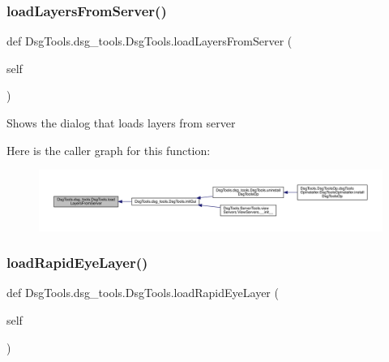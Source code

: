 \subsubsection{\texorpdfstring{load\+Layers\+From\+Server()}{loadLayersFromServer()}}
{\footnotesize\ttfamily def Dsg\+Tools.\+dsg\+\_\+tools.\+Dsg\+Tools.\+load\+Layers\+From\+Server (\begin{DoxyParamCaption}\item[{}]{self }\end{DoxyParamCaption})}

\begin{DoxyVerb}Shows the dialog that loads layers from server
\end{DoxyVerb}
 Here is the caller graph for this function\+:
\nopagebreak
\begin{figure}[H]
\begin{center}
\leavevmode
\includegraphics[width=350pt]{class_dsg_tools_1_1dsg__tools_1_1_dsg_tools_a285ff6e653cd985343cdf91acf8080ef_icgraph}
\end{center}
\end{figure}
\mbox{\label{class_dsg_tools_1_1dsg__tools_1_1_dsg_tools_affa471f53e1d341e8996ac5c7e9e3544}} 
\subsubsection{\texorpdfstring{load\+Rapid\+Eye\+Layer()}{loadRapidEyeLayer()}}
{\footnotesize\ttfamily def Dsg\+Tools.\+dsg\+\_\+tools.\+Dsg\+Tools.\+load\+Rapid\+Eye\+Layer (\begin{DoxyParamCaption}\item[{}]{self }\end{DoxyParamCaption})}

